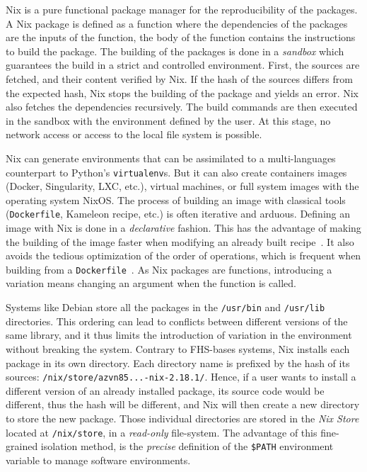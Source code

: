 \documentclass[sigconf,natbib=false]{acmart}
\begin{document}
Nix is a pure functional package manager for the reproducibility of the packages.
A Nix package is defined as a function where the dependencies of the packages are the inputs of the function, the body of the function contains the instructions to build the package.
The building of the packages is done in a \emph{sandbox} which guarantees the build in a strict and controlled environment.
First, the sources are fetched, and their content verified by Nix.
If the hash of the sources differs from the expected hash, Nix stops the building of the package and yields an error.
Nix also fetches the dependencies recursively.
The build commands are then executed in the sandbox with the environment defined by the user.
At this stage, no network access or access to the local file system is possible.


Nix can generate environments that can be assimilated to a multi-languages counterpart to Python's \texttt{virtualenv}s.
But it can also create containers images (Docker, Singularity, LXC, etc.), virtual machines, or full system images with the operating system NixOS.
The process of building an image with classical tools (\texttt{Dockerfile}, Kameleon recipe, etc.) is often iterative and arduous.
Defining an image with Nix is done in a \emph{declarative} fashion.
This has the advantage of making the building of the image faster when modifying an already built recipe\ \cite{nxc}.
It also avoids the tedious optimization of the order of operations, which is frequent when building from a \texttt{Dockerfile}\ \cite{docker_cache}. 
As Nix packages are functions, introducing a variation means changing an argument when the function is called.

Systems like Debian store all the packages in the \texttt{/usr/bin} and \texttt{/usr/lib} directories.
This ordering can lead to conflicts between different versions of the same library, and it thus limits the introduction of variation in the environment without breaking the system.
Contrary to FHS-bases systems, Nix installs each package in its own directory.
Each directory name is prefixed by the hash of its sources: \texttt{/nix/store/azvn85...-nix-2.18.1/}.
Hence, if a user wants to install a different version of an already installed package, its source code would be different, thus the hash will be different, and Nix will then create a new directory to store the new package.
Those individual directories are stored in the \emph{Nix Store} located at \texttt{/nix/store}, in a \emph{read-only} file-system.
The advantage of this fine-grained isolation method, is the \emph{precise} definition of the \texttt{\$PATH} environment variable to manage software environments.
\end{document}
